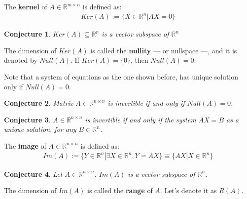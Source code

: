 \documentclass[aspectratio=169]{beamer}
\newtheorem{proposition}{Conjecture}[section]
\begin{document}
\begin{frame}
    \begin{definition}
        The \textbf{kernel} of $A\in\mathbb{R}^{m\times n}$ is defined as:
        \begin{align*}
            Ker(A):=\{X\in\mathbb{R}^n| AX = 0\}
        \end{align*}
    \end{definition}
    
    \begin{proposition}
        $Ker(A)\subseteq\mathbb{R}^n$ is a vector subspace of $\mathbb{R}^n$
    \end{proposition}
    
    \begin{definition}
        The dimension of $Ker(A)$ is called the \textbf{nullity} --- or nullspace ---, and it is denoted by $Null(A)$. If $Ker(A)=\{0\}$, then $Null(A)=0$.
    \end{definition}
    
    Note that a system of equations as the one shown before, has unique solution only if $Null(A)=0$.
    
\end{frame}

\begin{frame}
    \begin{proposition}
        Matrix $A\in\mathbb{R}^{n\times n}$ is invertible if and only if $Null(A)=0$.
    \end{proposition}
    
    \begin{proposition}
        $A\in\mathbb{R}^{n\times n}$ is invertible if and only if the system $AX=B$ as a unique solution, for any $B\in\mathbb{R}^n$.
    \end{proposition}
    
\end{frame}

\begin{frame}
    \begin{definition}
        The \textbf{image} of $A\in\mathbb{R}^{n\times n}$ is defined as:
        \begin{align*}
            Im(A):=\{Y\in\mathbb{R}^n|\exists X\in\mathbb{R}^n, Y=AX\}\equiv \{AX|X\in\mathbb{R}^n\}
        \end{align*}
    \end{definition}
    
    \begin{proposition}
        Let $A\in\mathbb{R}^{n\times n}$. $Im(A)$ is a vector subspace of $\mathbb{R}^n$.
    \end{proposition}
    
    \begin{definition}
        The dimension of $Im(A)$ is called the \textbf{range} of $A$. Let's denote it as $R(A)$.
    \end{definition}
\end{frame}
\end{document}
